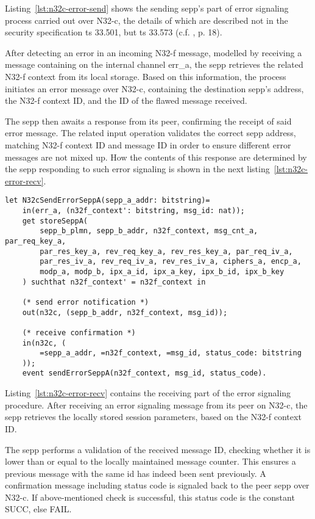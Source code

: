 Listing~\ref{lst:n32c-error-send} shows the sending \gls{sepp}'s part of error signaling process carried out over N32-c, the details of which are described not in the security specification \gls{ts} 33.501, but \gls{ts} 33.573 (c.f. \cite{3gpp.29.573}, p. 18).

After detecting an error in an incoming N32-f message, modelled by receiving a message containing on the internal channel {\sffamily err\_a}, the \gls{sepp} retrieves the related N32-f context from its local storage.
Based on this information, the process initiates an error message over N32-c, containing the destination \gls{sepp}'s address, the N32-f context ID, and the ID of the flawed message received.

The \gls{sepp} then awaits a response from its peer, confirming the receipt of said error message.
The related input operation validates the correct \gls{sepp} address, matching N32-f context ID and message ID in order to ensure different error messages are not mixed up.
How the contents of this response are determined by the \gls{sepp} responding to such error signaling is shown in the next listing~\ref{lst:n32c-error-recv}.

\begin{lstlisting}[caption={Definition of the sending error signaling process},label={lst:n32c-error-send},firstnumber=542]
let N32cSendErrorSeppA(sepp_a_addr: bitstring)=
    in(err_a, (n32f_context': bitstring, msg_id: nat));
    get storeSeppA(
        sepp_b_plmn, sepp_b_addr, n32f_context, msg_cnt_a, par_req_key_a,
        par_res_key_a, rev_req_key_a, rev_res_key_a, par_req_iv_a,
        par_res_iv_a, rev_req_iv_a, rev_res_iv_a, ciphers_a, encp_a,
        modp_a, modp_b, ipx_a_id, ipx_a_key, ipx_b_id, ipx_b_key
    ) suchthat n32f_context' = n32f_context in

    (* send error notification *)
    out(n32c, (sepp_b_addr, n32f_context, msg_id));

    (* receive confirmation *)
    in(n32c, (
        =sepp_a_addr, =n32f_context, =msg_id, status_code: bitstring
    ));
    event sendErrorSeppA(n32f_context, msg_id, status_code).
\end{lstlisting}

Listing~\ref{lst:n32c-error-recv} contains the receiving part of the error signaling procedure.
After receiving an error signaling message from its peer on N32-c, the \gls{sepp} retrieves the locally stored session parameters, based on the N32-f context ID.

The \gls{sepp} performs a validation of the received message ID, checking whether it is lower than or equal to the locally maintained message counter.
This ensures a previous message with the same id has indeed been sent previously.
A confirmation message including status code is signaled back to the peer \gls{sepp} over N32-c.
If above-mentioned check is successful, this status code is the constant {\sffamily SUCC}, else {\sffamily FAIL}.

